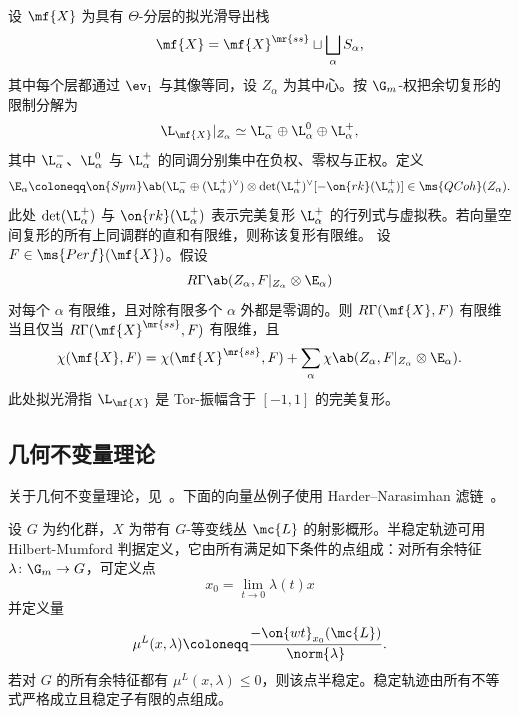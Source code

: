 \begin{thm}
    设 \(\mf{X}\) 为具有 \(\Theta\)-分层的拟光滑导出栈
    \[
        \mf{X}
        =
        \mf{X}^{\mr{ss}}
        \sqcup
        \bigsqcup_\alpha S_\alpha,
    \]
    其中每个层都通过 \(\ev_1\) 与其像等同，设 \(Z_\alpha\) 为其中心。按 \(\G_m\)-权把余切复形的限制分解为
    \[
        \L_{\mf{X}}|_{Z_\alpha}
        \simeq
        \L_\alpha^-
        \oplus
        \L_\alpha^0
        \oplus
        \L_\alpha^+,
    \]
    其中 \(\L_\alpha^-\)、\(\L_\alpha^0\) 与 \(\L_\alpha^+\) 的同调分别集中在负权、零权与正权。定义
    \[
        \E_\alpha
        \coloneqq
        \on{Sym}\ab(
            \L_\alpha^-
            \oplus
            (\L_\alpha^+)^\vee
        )
        \otimes
        \det(\L_\alpha^+)^\vee
        [-\on{rk}(\L_\alpha^+)]
        \in
        \ms{QCoh}(Z_\alpha).
    \]
    此处 \(\det(\L_\alpha^+)\) 与 \(\on{rk}(\L_\alpha^+)\) 表示完美复形 \(\L_\alpha^+\) 的行列式与虚拟秩。若向量空间复形的所有上同调群的直和有限维，则称该复形有限维。
    设 \(F\in\ms{Perf}(\mf{X})\)。假设
    \[
        R\Gamma\ab(
            Z_\alpha,
            F|_{Z_\alpha}\otimes\E_\alpha
        )
    \]
    对每个 \(\alpha\) 有限维，且对除有限多个 \(\alpha\) 外都是零调的。则 \(R\Gamma(\mf{X},F)\) 有限维当且仅当 \(R\Gamma(\mf{X}^{\mr{ss}},F)\) 有限维，且
    \[
        \chi(\mf{X},F)
        =
        \chi(\mf{X}^{\mr{ss}},F)
        +
        \sum_\alpha
        \chi\ab(
            Z_\alpha,
            F|_{Z_\alpha}\otimes\E_\alpha
        ).
    \]
    此处拟光滑指 \(\L_{\mf{X}}\) 是 Tor-振幅含于 \([-1,1]\) 的完美复形。
\end{thm}


\subsection{几何不变量理论}%
\label{sub:Geometric invariant theory}

关于几何不变量理论，见~\cite{MFK1994}。下面的向量丛例子使用 Harder--Narasimhan 滤链~\cite{HN1975}。

设 \(G\) 为约化群，\(X\) 为带有 \(G\)-等变线丛 \(\mc{L}\) 的射影概形。半稳定轨迹可用 Hilbert-Mumford 判据定义，它由所有满足如下条件的点组成：对所有余特征
\(\lambda \colon \G_m \to G\)，可定义点
\[ x_0 = \lim_{t \to 0} \lambda(t) x \]
并定义量
\[ \mu^L(x, \lambda) \coloneqq \frac{-\on{wt}_{x_0}(\mc{L})}{\norm{\lambda}}. \]
若对 \(G\) 的所有余特征都有 \(\mu^L(x, \lambda) \leq 0\)，则该点半稳定。稳定轨迹由所有不等式严格成立且稳定子有限的点组成。

